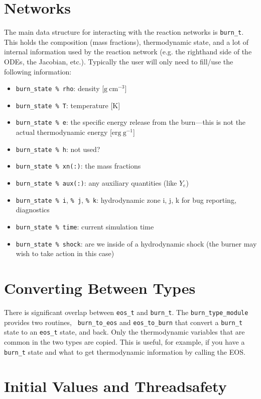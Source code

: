 \section{Networks}

The main data structure for interacting with the reaction networks is
{\tt burn\_t}.  This holds the composition (mass fractions),
thermodynamic state, and a lot of internal information used by the
reaction network (e.g. the righthand side of the ODEs, the Jacobian,
etc.).  Typically the user will only need to fill/use the following
information:
\begin{itemize}
\item {\tt burn\_state \% rho}: density [$\mathrm{g~cm^{-3}}$]

\item {\tt burn\_state \% T}: temperature [K]

\item {\tt burn\_state \% e}: the specific energy release from the
  burn---this is not the actual thermodynamic energy [$\mathrm{erg~g^{-1}}$] 

\item {\tt burn\_state \% h}: not used? 

\item {\tt burn\_state \% xn(:)}: the mass fractions

\item {\tt burn\_state \% aux(:)}: any auxiliary quantities (like $Y_e$)

\item {\tt burn\_state \% i}, {\tt \% j}, {\tt \% k}: hydrodynamic zone i, j, k for
  bug reporting, diagnostics

\item {\tt burn\_state \% time}: current simulation time

\item {\tt burn\_state \% shock}: are we inside of a hydrodynamic shock (the burner
  may wish to take action in this case)

\end{itemize}






\section{Converting Between Types}

There is significant overlap between {\tt eos\_t} and {\tt burn\_t}.
The {\tt burn\_type\_module} provides two routines, {\tt
  burn\_to\_eos} and {\tt eos\_to\_burn} that convert a {\tt burn\_t}
state to an {\tt eos\_t} state, and back.  Only the thermodynamic
variables that are common in the two types are copied.  This is
useful, for example, if you have a {\tt burn\_t} state and what to get
thermodynamic information by calling the EOS.


\section{Initial Values and Threadsafety}

